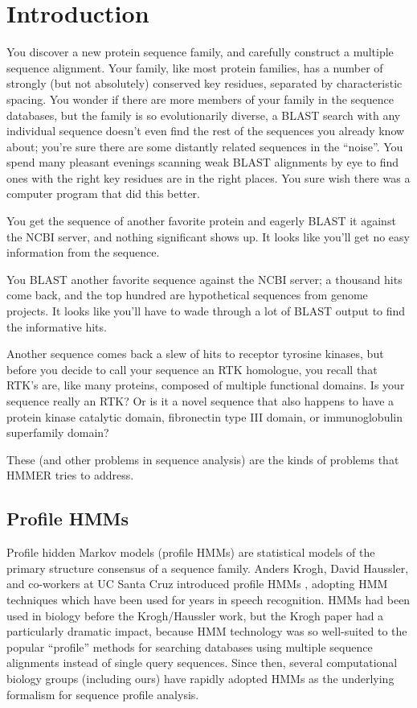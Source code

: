 \chapter{Introduction}

You discover a new protein sequence family, and carefully construct a
multiple sequence alignment. Your family, like most protein families,
has a number of strongly (but not absolutely) conserved key residues,
separated by characteristic spacing. You wonder if there are more
members of your family in the sequence databases, but the family is so
evolutionarily diverse, a BLAST search with any individual sequence
doesn't even find the rest of the sequences you already know about;
you're sure there are some distantly related sequences in the
``noise''. You spend many pleasant evenings scanning weak BLAST
alignments by eye to find ones with the right key residues are in the
right places. You sure wish there was a computer program that did this
better.

You get the sequence of another favorite protein and eagerly BLAST it
against the NCBI server, and nothing significant shows up. It looks
like you'll get no easy information from the sequence.

You BLAST another favorite sequence against the NCBI server; a
thousand hits come back, and the top hundred are hypothetical
sequences from genome projects. It looks like you'll have to wade
through a lot of BLAST output to find the informative hits.

Another sequence comes back a slew of hits to receptor tyrosine
kinases, but before you decide to call your sequence an RTK homologue,
you recall that RTK's are, like many proteins, composed of multiple
functional domains. Is your sequence really an RTK? Or is it a novel
sequence that also happens to have a protein kinase catalytic domain,
fibronectin type III domain, or immunoglobulin superfamily domain?

These (and other problems in sequence analysis) are the kinds of
problems that HMMER tries to address. 

\section {Profile HMMs}

Profile hidden Markov models (profile HMMs) are statistical models of
the primary structure consensus of a sequence family. Anders Krogh,
David Haussler, and co-workers at UC Santa Cruz introduced profile
HMMs \cite{Krogh94}, adopting HMM techniques which have been used for
years in speech recognition. HMMs had been used in biology before the
Krogh/Haussler work, but the Krogh paper had a particularly dramatic
impact, because HMM technology was so well-suited to the popular
``profile'' methods for searching databases using multiple sequence
alignments instead of single query sequences. Since then, several
computational biology groups (including ours) have rapidly adopted
HMMs as the underlying formalism for sequence profile analysis.

